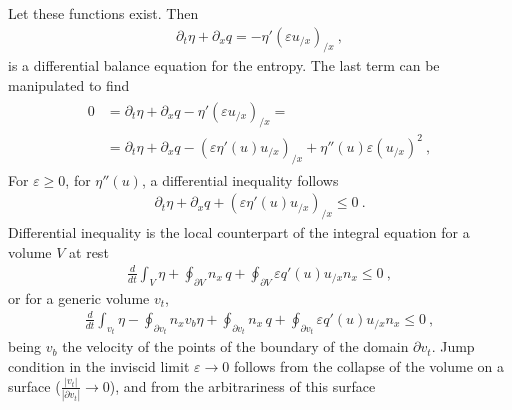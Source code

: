 \documentclass[letterpaper,10pt,english]{jupyterBook}
\begin{document}
\sphinxAtStartPar
{} Let these functions exist. Then
\begin{equation*}
\begin{split}\partial_t \eta + \partial_x q = - \eta' \left( \varepsilon u_{/x} \right)_{/x} \ ,\end{split}
\end{equation*}
\sphinxAtStartPar
is a differential balance equation for the entropy. The last term can be manipulated to find
\begin{equation*}
\begin{split}\begin{aligned}
  0 
  & = \partial_t \eta + \partial_x q - \eta' \left( \varepsilon u_{/x} \right)_{/x} = \\
  & = \partial_t \eta + \partial_x q - \left( \varepsilon \eta'(u) u_{/x} \right)_{/x} + \eta''(u) \varepsilon \left( u_{/x} \right)^2 \ ,
\end{aligned}\end{split}
\end{equation*}
\sphinxAtStartPar
For \(\varepsilon \ge 0\), for  \(\eta''(u)\), a differential inequality follows
\begin{equation*}
\begin{split}
   \partial_t \eta + \partial_x q + \left( \varepsilon \eta'(u) u_{/x} \right)_{/x} \le 0 \ .
\end{split}
\end{equation*}
\sphinxAtStartPar
{} Differential inequality is the local counterpart of the integral equation for a volume \(V\) at rest
\begin{equation*}
\begin{split}\frac{d}{dt} \int_{V} \eta + \oint_{\partial V} n_x \, q + \oint_{\partial V} \varepsilon q'(u) u_{/x} n_x \le 0 \ ,\end{split}
\end{equation*}
\sphinxAtStartPar
or for a generic volume \(v_t\),
\begin{equation*}
\begin{split}\frac{d}{dt} \int_{v_t} \eta - \oint_{\partial v_t} n_x v_b \eta + \oint_{\partial v_t} n_x \, q + \oint_{\partial v_t} \varepsilon q'(u) u_{/x} n_x \le 0 \ ,\end{split}
\end{equation*}
\sphinxAtStartPar
being \(v_b\) the velocity of the points of the boundary of the domain \(\partial v_t\). Jump condition in the inviscid limit \(\varepsilon \rightarrow 0\) follows from the collapse of the volume on a surface (\(\frac{|v_t|}{|\partial v_t|} \rightarrow 0\)), and from the arbitrariness of this surface
\end{document}

